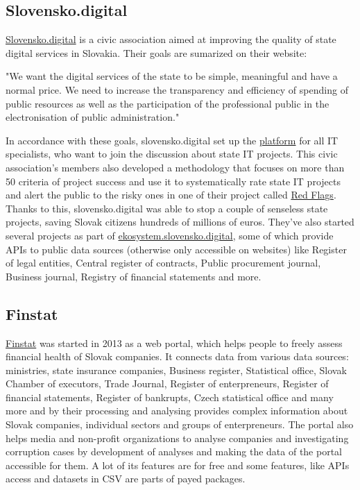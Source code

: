 \documentclass[thesis=B,english]{FITthesis}[2012/06/26]
\begin{document}
	\subsection{Slovensko.digital}
	\label{slovensko.digital}
	\href{https://slovensko.digital}{Slovensko.digital} is a civic association aimed at improving the quality of state digital services in Slovakia. 
	Their goals are sumarized on their website:
	\begin{displayquote}
		"We want the digital services of the state to be simple, meaningful and have a normal price. We need to increase the transparency and efficiency of spending of public resources as well as the participation of the professional public in the electronisation of public administration."
	\end{displayquote}
	In accordance with these goals, slovensko.digital set up the \href{https://platforma.slovensko.digital}{platform} for all IT specialists, who want to join the discussion about state IT projects. This civic association's members also developed a methodology that focuses on more than 50 criteria of project success and use it to systematically rate state IT projects and alert the public to the risky ones in one of their project called \href{https://redflags.slovensko.digital/}{Red Flags}. Thanks to this, slovensko.digital was able to stop a couple of senseless state projects, saving Slovak citizens hundreds of millions of euros. They've also started several projects as part of \href{https://ekosystem.slovensko.digital/}{ekosystem.slovensko.digital}, some of which provide APIs to public data sources (otherwise only accessible on websites) like Register of legal entities, Central register of contracts, Public procurement journal, Business journal, Registry of financial statements and more. 
	\subsection{Finstat}
	\href{https://finstat.sk/}{Finstat} was started in 2013 as a web portal, which helps people to freely assess financial health of Slovak companies. It connects data from various data sources: ministries, state insurance companies, Business register, Statistical office, Slovak Chamber of executors, Trade Journal, Register of enterpreneurs, Register of financial statements, Register of bankrupts, Czech statistical office and many more and by their processing and analysing provides complex information about Slovak companies, individual sectors and groups of enterpreneurs. The portal also helps media and non-profit organizations to analyse companies and investigating corruption cases by development of analyses and making the data of the portal accessible for them. A lot of its features are for free and some features, like APIs access and datasets in CSV are parts of payed packages.
\end{document}
